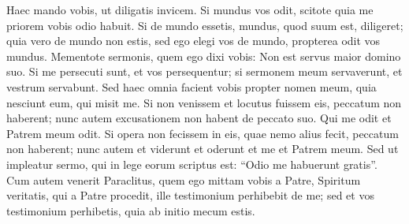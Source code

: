 \begin{biblechapter}
\verse Haec mando vobis, ut diligatis invicem. 
\verse Si mundus vos odit, scitote quia me priorem vobis odio habuit. 
\verse Si de mundo essetis, mundus, quod suum est, diligeret; quia vero de mundo non estis, sed ego elegi vos de mundo, propterea odit vos mundus. 
\verse Mementote sermonis, quem ego dixi vobis: Non est servus maior domino suo. Si me persecuti sunt, et vos persequentur; si sermonem meum servaverunt, et vestrum servabunt.  
\verse Sed haec omnia facient vobis propter nomen meum, quia nesciunt eum, qui misit me. 
\verse Si non venissem et locutus fuissem eis, peccatum non haberent; nunc autem excusationem non habent de peccato suo. 
\verse Qui me odit et Patrem meum odit. 
\verse Si opera non fecissem in eis, quae nemo alius fecit, peccatum non haberent; nunc autem et viderunt et oderunt et me et Patrem meum. 
\verse Sed ut impleatur sermo, qui in lege eorum scriptus est: “Odio me habuerunt gratis”. 
\verse Cum autem venerit Paraclitus, quem ego mittam vobis a Patre, Spiritum veritatis, qui a Patre procedit, ille testimonium perhibebit de me; 
\verse sed et vos testimonium perhibetis, quia ab initio mecum estis. 
\end{biblechapter}

